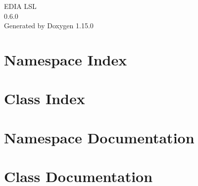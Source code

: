 \documentclass[twoside]{book}
\newcommand{\+}{\discretionary{\mbox{\scriptsize$\hookleftarrow$}}{}{}}
\newcommand{\clearemptydoublepage}{%
    \newpage{\pagestyle{empty}\cleardoublepage}%
  }
\begin{document}
  \raggedbottom
    \hypersetup{pageanchor=false,
                bookmarksnumbered=true,
                pdfencoding=unicode
               }
  \begin{titlepage}
  \vspace*{7cm}
  \begin{center}%
  {\Large EDIA LSL}\\
  [1ex]\large 0.\+6.\+0 \\
  \vspace*{1cm}
  {\large Generated by Doxygen 1.15.0}\\
  \end{center}
  \end{titlepage}
  \clearemptydoublepage
  \tableofcontents
  \clearemptydoublepage
  \hypersetup{pageanchor=true}
\chapter{Namespace Index}

\chapter{Class Index}

\chapter{Namespace Documentation}


\chapter{Class Documentation}






  \backmatter
  \newpage
  \clearemptydoublepage
  \printindex
\end{document}

